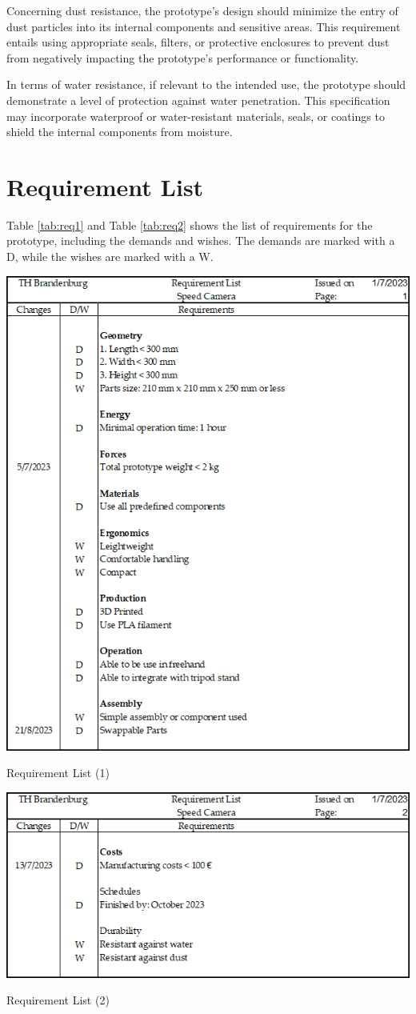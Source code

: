 Concerning dust resistance, the prototype's design should minimize the entry of dust particles into its internal components and sensitive areas. This requirement entails using appropriate seals, filters, or protective enclosures to prevent dust from negatively impacting the prototype's performance or functionality.

In terms of water resistance, if relevant to the intended use, the prototype should demonstrate a level of protection against water penetration. This specification may incorporate waterproof or water-resistant materials, seals, or coatings to shield the internal components from moisture.

\section{Requirement List}
Table \ref{tab:req1} and Table \ref{tab:req2} shows the list of requirements for the prototype, including the demands and wishes. The demands are marked with a D, while the wishes are marked with a W.

\begin{table}[H]
    \centering
    \includegraphics[width= 0.9\linewidth]{texs/Part1/chapter2/image/req1.png}
    \caption{Requirement List (1)}
    \label{tab:req1}
\end{table}

\begin{table}[H]
    \centering
    \includegraphics[width= 0.9\linewidth]{texs/Part1/chapter2/image/req2.png}
    \caption{Requirement List (2)}
    \label{tab:req2}
\end{table}
